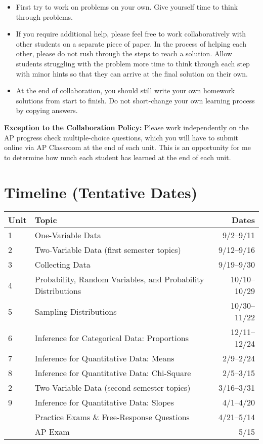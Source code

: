 \documentclass[12pt,fleqn]{article}
\providecommand{\tightlist}{%
  \setlength{\itemsep}{0pt}\setlength{\parskip}{0pt}}
\begin{document}
\begin{itemize}
\tightlist
\item
  First try to work on problems on your own. Give yourself time to think through problems.
\item
  If you require additional help, please feel free to work collaboratively with other students on a separate piece of paper. In the process of helping each other, please do not rush through the steps to reach a solution. Allow students struggling with the problem more time to think through each step with minor hints so that they can arrive at the final solution on their own.
\item
  At the end of collaboration, you should still write your own homework solutions from start to finish. Do not short-change your own learning process by copying answers.
\end{itemize}

\textbf{Exception to the Collaboration Policy:} Please work independently on the AP progress check multiple-choice questions, which you will have to submit online via AP Classroom at the end of each unit. This is an opportunity for me to determine how much each student has learned at the end of each unit.

\hypertarget{timeline-tentative-dates}{%
\section{Timeline (Tentative Dates)}\label{timeline-tentative-dates}}

\begin{longtable}[]{@{}llr@{}}
\toprule
Unit & Topic & Dates\tabularnewline
\midrule
\endhead
1 & One-Variable Data & 9/2--9/11\tabularnewline
2 & Two-Variable Data (first semester topics) & 9/12--9/16\tabularnewline
3 & Collecting Data & 9/19--9/30\tabularnewline
4 & Probability, Random Variables, and Probability Distributions & 10/10--10/29\tabularnewline
5 & Sampling Distributions & 10/30--11/22\tabularnewline
6 & Inference for Categorical Data: Proportions & 12/11--12/24\tabularnewline
7 & Inference for Quantitative Data: Means & 2/9--2/24\tabularnewline
8 & Inference for Quantitative Data: Chi-Square & 2/5--3/15\tabularnewline
2 & Two-Variable Data (second semester topics) & 3/16--3/31\tabularnewline
9 & Inference for Quantitative Data: Slopes & 4/1--4/20\tabularnewline
& Practice Exams \& Free-Response Questions & 4/21--5/14\tabularnewline
& AP Exam & 5/15\tabularnewline
\bottomrule
\end{longtable}

\end{document}
